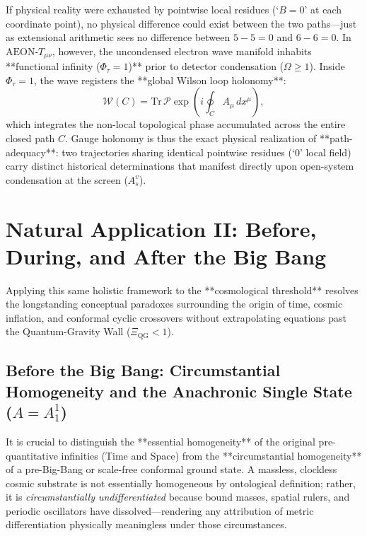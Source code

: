 \documentclass[11pt,a4paper]{article}
\begin{document}
If physical reality were exhausted by pointwise local residues (`$B = 0$' at each coordinate point), no physical difference could exist between the two paths—just as extensional arithmetic sees no difference between $5 - 5 = 0$ and $6 - 6 = 0$. In $\text{AEON-}T_{\mu\nu}$, however, the uncondensed electron wave manifold inhabits **functional infinity ($\Phi_\tau = 1$)** prior to detector condensation ($\Omega \ge 1$). Inside $\Phi_\tau = 1$, the wave registers the **global Wilson loop holonomy**:
\begin{equation}
    \mathcal{W}(C) = \mathrm{Tr}\,\mathcal{P}\exp\!\left(i \oint_C A_\mu\,dx^\mu\right),
\end{equation}
which integrates the non-local topological phase accumulated across the entire closed path $C$. Gauge holonomy is thus the exact physical realization of **path-adequacy**: two trajectories sharing identical pointwise residues (`$0$' local field) carry distinct historical determinations that manifest directly upon open-system condensation at the screen ($A_s^v$).

\section{Natural Application II: Before, During, and After the Big Bang}

Applying this same holistic framework to the **cosmological threshold** resolves the longstanding conceptual paradoxes surrounding the origin of time, cosmic inflation, and conformal cyclic crossovers without extrapolating equations past the Quantum-Gravity Wall ($\Xi_{\mathrm{QG}} < 1$).

\subsection{Before the Big Bang: Circumstantial Homogeneity and the Anachronic Single State ($A = A_1^1$)}

It is crucial to distinguish the **essential homogeneity** of the original pre-quantitative infinities (Time and Space) from the **circumstantial homogeneity** of a pre-Big-Bang or scale-free conformal ground state. A massless, clockless cosmic substrate is not essentially homogeneous by ontological definition; rather, it is \emph{circumstantially undifferentiated} because bound masses, spatial rulers, and periodic oscillators have dissolved—rendering any attribution of metric differentiation physically meaningless under those circumstances.
\end{document}
